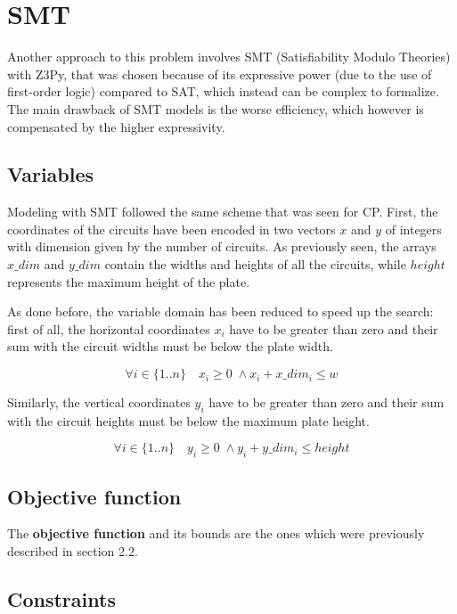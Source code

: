 \section{SMT}

Another approach to this problem involves SMT (Satisfiability Modulo Theories) with Z3Py, that was chosen because of its expressive power (due to the use of first-order logic) compared to SAT, which instead can be complex to formalize. The main drawback of SMT models is the worse efficiency, which however is compensated by the higher expressivity.

\subsection{Variables}

Modeling with SMT followed the same scheme that was seen for CP.
First, the coordinates of the circuits have been encoded in two vectors $x$ and $y$ of integers with dimension given by the number of circuits.
As previously seen, the arrays $x\_dim$ and $y\_dim$ contain the widths and heights of all the circuits, while $height$ represents the maximum height of the plate.


As done before, the variable domain has been reduced to speed up the search: first of all, the horizontal coordinates $x_i$ have to be greater than zero and their sum with the circuit widths must be below the plate width.

\begin{equation*}
    \forall i \in \{1..n\} \quad x_i \geq 0 \; \land x_i + x\_dim_i \leq w
\end{equation*}

Similarly, the vertical coordinates $y_i$ have to be greater than zero and their sum with the circuit heights must be below the maximum plate height.

\begin{equation*}
     \forall i \in \{1..n\} \quad y_i \geq 0 \; \land y_i + y\_dim_i \leq height
\end{equation*}

\subsection{Objective function}

The \textbf {objective function} and its bounds are the ones which were previously described in section 2.2.

\subsection{Constraints}

